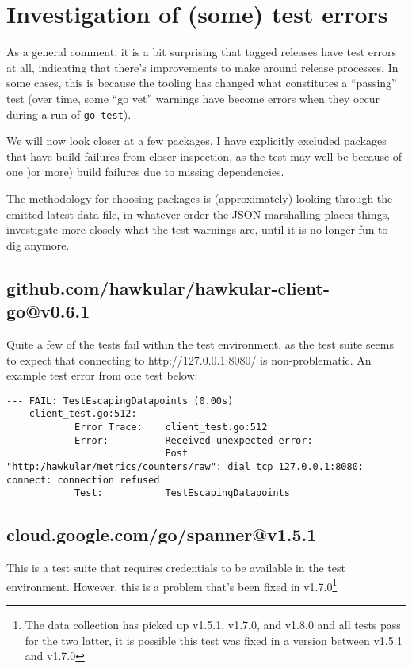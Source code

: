 \documentclass[a4paper]{paper}
\begin{document}
\section{Investigation of (some) test errors}

As a general comment, it is a bit surprising that tagged releases have
test errors at all, indicating that there's improvements to make
around release processes. In some cases, this is because the tooling
has changed what constitutes a ``passing'' test (over time, some ``go
vet'' warnings have become errors when they occur during a run of {\tt go test}).

We will now look closer at a few packages. I have explicitly excluded
packages that have build failures from closer inspection, as the test
may well be because of one )or more) build failures due to missing
dependencies.

The methodology for choosing packages is (approximately) looking
through the emitted latest data file, in whatever order the JSON
marshalling places things, investigate more closely what the test
warnings are, until it is no longer fun to dig anymore.

\subsection{github.com/hawkular/hawkular-client-go@v0.6.1}

Quite a few of the tests fail within the test environment, as the test suite seems to expect that connecting to http://127.0.0.1:8080/ is non-problematic. An example test error from one test below:

\begin{verbatim}
--- FAIL: TestEscapingDatapoints (0.00s)
    client_test.go:512: 
        	Error Trace:	client_test.go:512
        	Error:      	Received unexpected error:
        	            	Post "http:/hawkular/metrics/counters/raw": dial tcp 127.0.0.1:8080: connect: connection refused
        	Test:       	TestEscapingDatapoints
\end{verbatim}

\subsection{cloud.google.com/go/spanner@v1.5.1}

This is a test suite that requires credentials to be available in the test environment. However, this is a problem that's been fixed in v1.7.0\footnote{The data collection has picked up v1.5.1, v1.7.0, and v1.8.0 and all tests pass for the two latter, it is possible this test was fixed in a version between v1.5.1 and v1.7.0}
\end{document}

